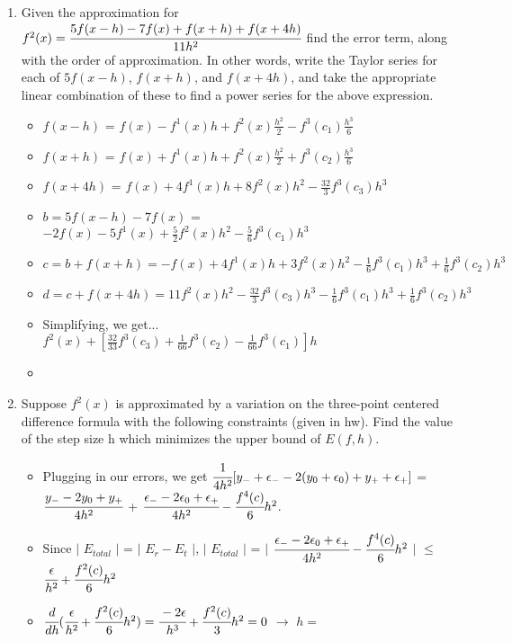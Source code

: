 \documentclass[12pt]{article}
\begin{document}
\begin{enumerate}

	\item Given the approximation for $f^{2}(x) = \cfrac{5f(x-h)-7f(x)+f(x+h)+f(x+4h)}{11h^2}$ find the error term, along with the order of approximation. In other words, write the Taylor series for each of $5f(x-h)$, $f(x+h)$, and $f(x+4h)$, and take the appropriate linear combination of these to find a power series for the above expression.
	\begin{itemize}
		\item $f(x-h)$ = $f(x) - f^1(x)h + f^2(x)\frac{h^2}{2} - f^3(c_1)\frac{h^3}{6}$
		\item $f(x+h)$ = $f(x) + f^1(x)h + f^2(x)\frac{h^2}{2} + f^3(c_2)\frac{h^3}{6}$
		\item $f(x+4h)$ = $f(x) + 4f^1(x)h + 8f^2(x)h^2 - \frac{32}{3}f^3(c_3)h^3$
		\item $b = 5f(x-h)-7f(x)$ = $-2f(x) - 5f^1(x) + \frac{5}{2}f^2(x)h^2 - \frac{5}{6}f^3(c_1)h^3$
		\item $c = b+f(x+h) = -f(x) + 4f^1(x)h+3f^2(x)h^2-\frac{1}{6}f^3(c_1)h^3 + \frac{1}{6}f^3(c_2)h^3$ 
		\item $d = c+f(x+4h) = 11f^2(x)h^2-\frac{32}{3}f^3(c_3)h^3 -\frac{1}{6}f^3(c_1)h^3 + \frac{1}{6}f^3(c_2)h^3$ 
		\item Simplifying, we get... \\
		$f^2(x) + [\frac{32}{33}f^3(c_3) + \frac{1}{66}f^3(c_2) - \frac{1}{66}f^3(c_1)]h$
		\item {}
	\end{itemize}
	
	\item Suppose $f^2(x)$ is approximated by a variation on the three-point centered difference formula with the following constraints (given in hw). Find the value of the step size h which minimizes the upper bound of $E(f,h)$.
	\begin{itemize}
		\item Plugging in our errors, we get $\cfrac{1}{4h^2}[y_- + \epsilon_- - 2(y_0 + \epsilon_0) + y_+ + \epsilon_+]$ = \\
$\cfrac{y_- - 2y_0 + y_+}{4h^2}$ + $\cfrac{\epsilon_- - 2\epsilon_0 + \epsilon_+}{4h^2} - \cfrac{f^4(c)}{6}h^2$. 
	\item Since $|$ $E_{total}$ $|$ = $|$ $E_r - E_t$ $|$,  $|$ $E_{total}$ $|$ = $|$ $\cfrac{\epsilon_- - 2\epsilon_0 + \epsilon_+}{4h^2} - \cfrac{f^4(c)}{6}h^2$ $|$ $\leq$ $\cfrac{\epsilon}{h^2} + \cfrac{f^2(c)}{6}h^2$
	\item $\cfrac{d}{dh}(\cfrac{\epsilon}{h^2} + \cfrac{f^2(c)}{6}h^2) = \cfrac{-2\epsilon}{h^3} + \cfrac{f^2(c)}{3}h^2 = 0$ $\rightarrow$ $h =$ 	
	\end{itemize}
	

\end{enumerate}
\end{document}
